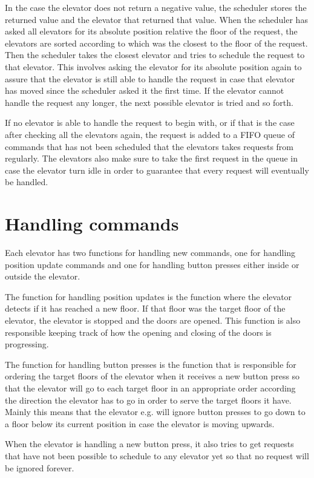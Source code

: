 \documentclass[10pt,a4paper]{article}
\begin{document}
In the case the elevator does not return a negative value, the scheduler stores the returned value and the elevator that returned that value. When the scheduler has asked all elevators for its absolute position relative the floor of the request, the elevators are sorted according to which was the closest to the floor of the request. Then the scheduler takes the closest elevator and tries to schedule the request to that elevator. This involves asking the elevator for its absolute position
again to assure that the elevator is still able to handle the request in case that elevator has moved since the scheduler asked it the first time. If the elevator cannot handle the request any longer, the next possible elevator is tried and so forth.

If no elevator is able to handle the request to begin with, or if that is the case after checking all the elevators again, the request is added to a FIFO queue of commands that has not been scheduled that the elevators takes requests from regularly. The elevators also make sure to take the first request in the queue in case the elevator turn idle in order to guarantee that every request will eventually be handled.

\section{Handling commands}
\label{sec:commands}
Each elevator has two functions for handling new commands, one for handling position update commands and one for handling button presses either inside or outside the elevator.

The function for handling position updates is the function where the elevator detects if it has reached a new floor. If that floor was the target floor of the elevator, the elevator is stopped and the doors are opened. This function is also responsible keeping track of how the opening and closing of the doors is progressing.

The function for handling button presses is the function that is responsible for ordering the target floors of the elevator when it receives a new button press so that the elevator will go to each target floor in an appropriate order according the direction the elevator has to go in order to serve the target floors it have. Mainly this means that the elevator e.g. will ignore button presses to go down to a floor below its current position in case the elevator is moving upwards.

When the elevator is handling a new button press, it also tries to get requests that have not been possible to schedule to any elevator yet so that no request will be ignored forever.
\end{document}
